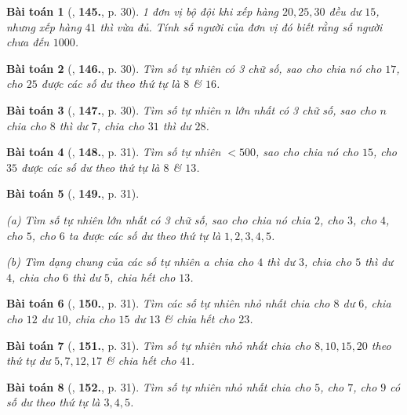 \documentclass{article}
\numberwithin{equation}{section}
\newtheorem{baitoan}{Bài toán}[section]
\begin{document}
\begin{baitoan}[\cite{Binh_Toan_6_tap_1}, \textbf{145.}, p. 30]
	1 đơn vị bộ đội khi xếp hàng $20,25,30$ đều dư $15$, nhưng xếp hàng $41$ thì vừa đủ. Tính số người của đơn vị đó biết rằng số người chưa đến $1000$.
\end{baitoan}

\begin{baitoan}[\cite{Binh_Toan_6_tap_1}, \textbf{146.}, p. 30]
	Tìm số tự nhiên có 3 chữ số, sao cho chia nó cho $17$, cho $25$ được các số dư theo thứ tự là $8$ \& $16$.
\end{baitoan}

\begin{baitoan}[\cite{Binh_Toan_6_tap_1}, \textbf{147.}, p. 30]
	Tìm số tự nhiên $n$ lớn nhất có 3 chữ số, sao cho $n$ chia cho $8$ thì dư $7$, chia cho $31$ thì dư $28$.
\end{baitoan}

\begin{baitoan}[\cite{Binh_Toan_6_tap_1}, \textbf{148.}, p. 31]
	Tìm số tự nhiên $< 500$, sao cho chia nó cho $15$, cho $35$ được các số dư theo thứ tự là $8$ \& $13$.
\end{baitoan}

\begin{baitoan}[\cite{Binh_Toan_6_tap_1}, \textbf{149.}, p. 31]
	\begin{enumerate*}
		\item[(a)] Tìm số tự nhiên lớn nhất có 3 chữ số, sao cho chia nó chia $2$, cho $3$, cho $4$, cho $5$, cho $6$ ta được các số dư theo thứ tự là $1,2,3,4,5$.
		\item[(b)] Tìm dạng chung của các số tự nhiên $a$ chia cho $4$ thì dư $3$, chia cho $5$ thì dư $4$, chia cho $6$ thì dư $5$, chia hết cho $13$.
	\end{enumerate*}
\end{baitoan}

\begin{baitoan}[\cite{Binh_Toan_6_tap_1}, \textbf{150.}, p. 31]
	Tìm các số tự nhiên nhỏ nhất chia cho $8$ dư $6$, chia cho $12$ dư $10$, chia cho $15$ dư $13$ \& chia hết cho $23$.
\end{baitoan}

\begin{baitoan}[\cite{Binh_Toan_6_tap_1}, \textbf{151.}, p. 31]
	Tìm số tự nhiên nhỏ nhất chia cho $8,10,15,20$ theo thứ tự dư $5,7,12,17$ \& chia hết cho $41$.
\end{baitoan}

\begin{baitoan}[\cite{Binh_Toan_6_tap_1}, \textbf{152.}, p. 31]
	Tìm số tự nhiên nhỏ nhất chia cho $5$, cho $7$, cho $9$ có số dư theo thứ tự là $3,4,5$.
\end{baitoan}
\end{document}
